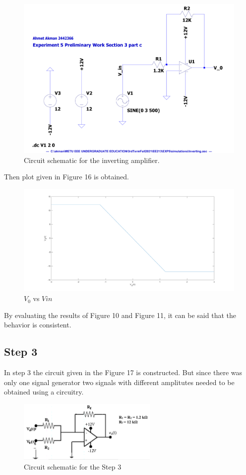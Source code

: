 \documentclass[letterpaper,12pt]{article}
\begin{document}
\begin{figure}[H]
	\centering
   \includegraphics[width=1\textwidth]{Inverting_SCH.pdf}
   \caption{Circuit schematic for the inverting amplifier.}
\end{figure} 
Then plot given in Figure  16 is obtained.

\begin{figure}[H]
	\centering
   \includegraphics[width=1\textwidth]{3c_vs_vin.png}
   \caption{\(V_0\) vs \(V{in}\)}
\end{figure}
By evaluating the results of Figure 10 and Figure 11, it can be said that the behavior is consistent.
\subsection{Step 3}
In step 3 the circuit given in the Figure 17 is constructed. But since there was only one signal generator two signals with different amplitutes needed to be obtained using a circuitry.
\begin{figure}[H]
	\centering
   \includegraphics[width=0.6\textwidth]{circuit5.png}
   \caption{Circuit schematic for the Step 3}
\end{figure} 
\end{document}
